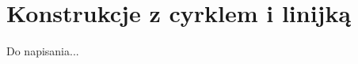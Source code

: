 \documentclass{parchment}
\begin{document}













\chapter{Konstrukcje z cyrklem i linijką}
Do napisania...

{}


\raggedright
{}
\printindex

\printindex[persons]
\end{document}
